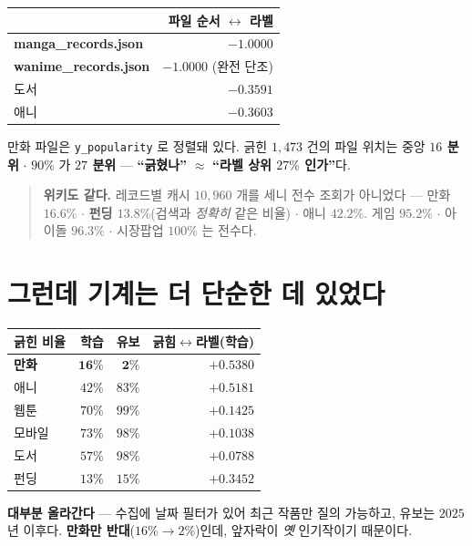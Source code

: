 \documentclass[11pt]{article}
\begin{document}
\begin{center}
\begin{tabular}{lr}
\hline
 & 파일 순서 $\leftrightarrow$ 라벨 \\
\hline
\textbf{manga\_records.json} & $\mathbf{-1.0000}$ \\
\textbf{wanime\_records.json} & $\mathbf{-1.0000}$ (완전 단조) \\
도서 & $-0.3591$ \\
애니 & $-0.3603$ \\
\hline
\end{tabular}
\end{center}

만화 파일은 \texttt{y\_popularity} 로 정렬돼 있다. 긁힌 $1{,}473$ 건의 파일
위치는 중앙 \textbf{$16$ 분위} $\cdot$ $90\%$ 가 \textbf{$27$ 분위} ---
\textbf{``긁혔나''} $\approx$ \textbf{``라벨 상위 $27\%$ 인가''}다.

\begin{quote}
\textbf{위키도 같다.} 레코드별 캐시 $10{,}960$ 개를 세니 전수 조회가
아니었다 --- 만화 $16.6\%$ $\cdot$ \textbf{펀딩 $13.8\%$}(검색과 \emph{정확히}
같은 비율) $\cdot$ 애니 $42.2\%$. 게임 $95.2\%$ $\cdot$ 아이돌 $96.3\%$
$\cdot$ 시장팝업 $100\%$ 는 전수다.
\end{quote}

\section{그런데 기계는 더 단순한 데 있었다}

\begin{center}
\begin{tabular}{lrrr}
\hline
긁힌 비율 & 학습 & 유보 & 긁힘$\leftrightarrow$라벨(학습) \\
\hline
\textbf{만화} & $\mathbf{16\%}$ & $\mathbf{2\%}$ & $+0.5380$ \\
애니 & $42\%$ & $83\%$ & $+0.5181$ \\
웹툰 & $70\%$ & $99\%$ & $+0.1425$ \\
모바일 & $73\%$ & $98\%$ & $+0.1038$ \\
도서 & $57\%$ & $98\%$ & $+0.0788$ \\
펀딩 & $13\%$ & $15\%$ & $+0.3452$ \\
\hline
\end{tabular}
\end{center}

\textbf{대부분 올라간다} --- 수집에 날짜 필터가 있어 최근 작품만 질의
가능하고, 유보는 $2025$ 년 이후다. \textbf{만화만 반대}($16\% \to 2\%$)인데,
앞자락이 \emph{옛} 인기작이기 때문이다.
\end{document}
